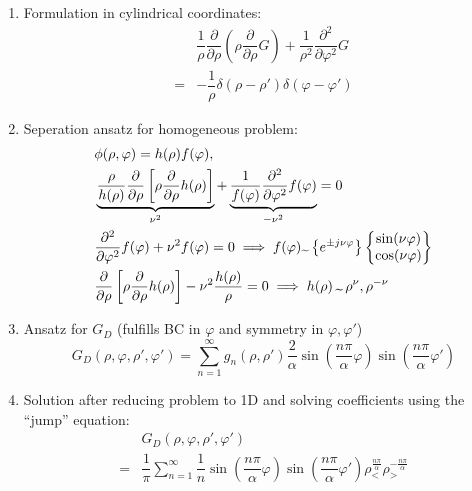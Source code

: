 \begin{enumerate}
  \item Formulation in cylindrical coordinates:
        \begin{align*}
          &\dfrac{1}{\rho} \dfrac{\partial}{\partial\rho}\left(\rho \dfrac{\partial}{\partial\rho}G\right)
          + \dfrac{1}{\rho^{2}}\dfrac{\partial^{2}}{\partial \varphi^{2}}G\\
          = &-\dfrac{1}{\rho} \delta(\rho - \rho') \delta(\varphi - \varphi')
        \end{align*}
  \item Seperation ansatz for homogeneous problem:
        \begin{align*}
          &\phi(\rho, \varphi) = h(\rho) f(\varphi),\\
          &\underbrace{\dfrac{\rho}{h(\rho)} \dfrac{\partial}{\partial\rho} \left[\rho \dfrac{\partial}{\partial\rho} h(\rho)\right]}_{\nu^{2}}
            + \underbrace{\dfrac{1}{f(\varphi)} \dfrac{\partial^{2}}{\partial\varphi^{2}} f(\varphi)}_{-\nu^{2}}
            = 0\\
          & \dfrac{\partial^{2}}{\partial\varphi^{2}}f(\varphi) + \nu^{2}f(\varphi) = 0
            \implies f(\varphi) \text{\texttildelow} \left\{e^{\pm j\nu \varphi}\right\}
          \begin{Bmatrix} \sin(\nu\varphi)\\ \cos(\nu\varphi) \end{Bmatrix}\\
          & \dfrac{\partial}{\partial\rho} \left[\rho \dfrac{\partial}{\partial\rho} h(\rho)\right] - \nu^{2}\dfrac{h(\rho)}{\rho} = 0
            \implies h(\rho) \, \text{\texttildelow} \, \rho^{\nu}, \rho^{-\nu}
        \end{align*}
  \item Ansatz for $G_{D}$ (fulfills BC in $\varphi$ and symmetry in $\varphi, \varphi'$)
        \begin{equation*}
          G_{D}(\rho, \varphi, \rho', \varphi') = \sum\limits_{n=1}^{\infty} g_{n}(\rho, \rho')
          \dfrac{2}{\alpha}
          \sin\left(\dfrac{n\pi}{\alpha} \varphi\right)
          \sin\left(\dfrac{n\pi}{\alpha} \varphi'\right)
        \end{equation*}
  \item Solution after reducing problem to 1D and solving coefficients using the ``jump'' equation:
        \begin{align*}
          &G_{D}(\rho, \varphi, \rho', \varphi')\\
          = &\dfrac{1}\pi \sum\limits_{n=1}^{\infty} \dfrac{1}{n}
          \sin\left(\dfrac{n\pi}{\alpha} \varphi\right)
          \sin\left(\dfrac{n\pi}{\alpha} \varphi'\right)
          \rho_{<}^{\frac{n\pi}{\alpha}}
          \rho_{>}^{-\frac{n\pi}{\alpha}}
        \end{align*}
\end{enumerate}
